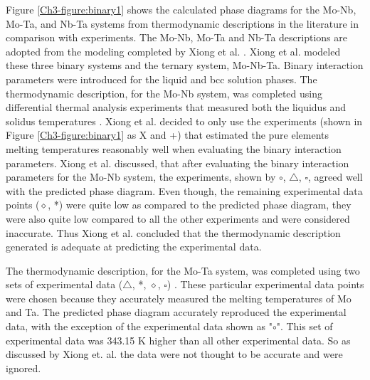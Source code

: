 Figure \ref{Ch3-figure:binary1} shows the calculated phase diagrams for the Mo-Nb, Mo-Ta, and Nb-Ta systems from thermodynamic descriptions in the literature in comparison with experiments. The Mo-Nb, Mo-Ta and Nb-Ta descriptions are adopted from the modeling completed by Xiong et al. \cite{Xiong2004}. Xiong et al. \cite{Xiong2004} modeled these three binary systems and the ternary system, Mo-Nb-Ta. Binary interaction parameters were introduced for the liquid and bcc solution phases. The thermodynamic description, for the Mo-Nb system, was completed using differential thermal analysis experiments that measured both the liquidus and solidus temperatures \cite{Xiong2004}. Xiong et al. \cite{Xiong2004} decided to only use the experiments (shown in Figure \ref{Ch3-figure:binary1} as X and +) that estimated the pure elements melting temperatures reasonably well when evaluating the binary interaction parameters. Xiong et al. \cite{Xiong2004} discussed, that after evaluating the binary interaction parameters for the Mo-Nb system, the experiments, shown by $\circ$, $\bigtriangleup$, $\square$, agreed well with the predicted phase diagram. Even though, the remaining experimental data points ($\diamond$, *) were quite low as compared to the predicted phase diagram, they were also quite low compared to all the other experiments \cite{Xiong2004} and were considered inaccurate. Thus Xiong et al. \cite{Xiong2004} concluded that the thermodynamic description generated is adequate at predicting the experimental data. 

The thermodynamic description, for the Mo-Ta system, was completed using two sets of experimental data ($\bigtriangleup$, *, $\diamond$, $\square$) \cite{Xiong2004}. These particular experimental data points were chosen because they accurately measured the melting temperatures of Mo and Ta. The predicted phase diagram accurately reproduced the experimental data, with the exception of the experimental data \cite{Xiong2004} shown as "$\circ$". This set of experimental data was 343.15 K higher than all other experimental data. So as discussed by Xiong et. al. \cite{Xiong2004} the data were not thought to be accurate and were ignored. 

